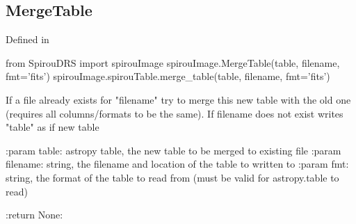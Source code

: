 
\noindent\begin{minipage}{\textwidth}
\subsection{MergeTable}

Defined in \spirouImage{}

\begin{pythonbox}
from SpirouDRS import spirouImage
spirouImage.MergeTable(table, filename, fmt='fits')
spirouImage.spirouTable.merge_table(table, filename, fmt='fits')
\end{pythonbox}

\begin{pythondocstring}
If a file already exists for "filename" try to merge this new table with
the old one (requires all columns/formats to be the same).
If filename does not exist writes "table" as if new table

:param table:  astropy table, the new table to be merged to existing file
:param filename: string, the filename and location of the table
                 to written to
:param fmt: string, the format of the table to read from (must be valid
            for astropy.table to read)

:return None:
\end{pythondocstring}
\end{minipage}



